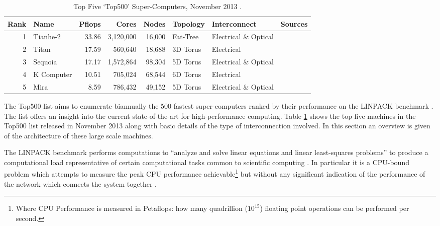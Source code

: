 		\label{sec:super-computers}
		
		\begin{table}
			\center
			\begin{tabular}{r l r r r l l l}
				\toprule
				Rank & Name    & Pflops& Cores  & Nodes  & Topology & Interconnect          & Sources \\
				\midrule                          
				1 & Tianhe-2   & 33.86 & 3,120,000 & 16,000 & Fat-Tree & Electrical \& Optical & \cite{dongarra13} \\
				2 & Titan      & 17.59 & 560,640   & 18,688 & 3D Torus & Electrical            & \cite{bland12} \\
				3 & Sequoia    & 17.17 & 1,572,864 & 98,304 & 5D Torus & Electrical \& Optical & \cite{prickett10} \\
				4 & K Computer & 10.51 & 705,024   & 68,544 & 6D Torus & Electrical            & \cite{fujitsu11,yokokawa11} \\
				5 & Mira       &  8.59 & 786,432   & 49,152 & 5D Torus & Electrical \& Optical & \cite{prickett10} \\
				\bottomrule
			\end{tabular}
			
			\caption{Top Five `Top500' Super-Computers, November 2013 \cite{meuer13n}.}
			\label{tab:top500}
		\end{table}
		
		The Top500 list \cite{meuer13n} aims to enumerate biannually the 500 fastest
		super-computers ranked by their performance on the LINPACK benchmark
		\cite{dongarraLINPAC}. The list offers an insight into the current
		state-of-the-art for high-performance computing. Table \ref{tab:top500}
		shows the top five machines in the Top500 list released in November 2013
		along with basic details of the type of interconnection involved. In this
		section an overview is given of the architecture of these large scale
		machines.
		
		The LINPACK benchmark performs computations to ``analyze and solve linear
		equations and linear least-squares problems'' to produce a computational
		load representative of certain computational tasks common to scientific
		computing \cite{dongarra84}. In particular it is a CPU-bound problem which
		attempts to measure the peak CPU performance achievable\footnote{Where CPU
		Performance is measured in Petaflops: how many quadrillion ($10^{15}$)
		floating point operations can be performed per second.} but without any
		significant indication of the performance of the network which connects the
		system together \cite{dongarra07}.
		

